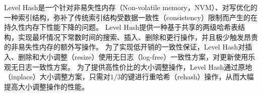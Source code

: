 
Level Hash\cite{zuo2018write}是一个针对非易失性内存（Non-volatile memory，NVM）、对写优化的一种索引结构，弥补了传统索引结构受数据一致性（consistency）限制而产生的在持久性内存下性能下降的问题。
Level Hash提供一种基于共享的两级哈希表结构，实现最坏情况下常数时间的搜索、插入、删除和更行操作，并且极少触发昂贵的非易失性内存的额外写操作。
为了实现低开销的一致性保证，Level Hash对插入、删除和大小调整（resize）使用无日志（log-free）一致性方案，对更新使用乐观无日志一致性方案。
为了提供高性价比的大小调整操作，Level Hash通过原地（inplace）大小调整方案，只需对$1/3$的键进行重哈希（rehash）操作，从而大幅提高大小调整操作的性能。


